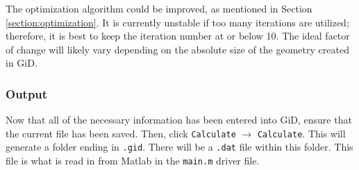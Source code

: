 The optimization algorithm could be improved, as mentioned in Section \ref{section:optimization}. It is currently unstable if too many iterations are utilized; therefore, it is best to keep the iteration number at or below 10. The ideal factor of change will likely vary depending on the absolute size of the geometry created in GiD.

\subsubsection{Output}
Now that all of the necessary information has been entered into GiD, ensure that the current file has been saved. Then, click \texttt{Calculate} $\rightarrow$ \texttt{Calculate}. This will generate a folder ending in \texttt{.gid}. There will be a \texttt{.dat} file within this folder. This file is what is read in from Matlab in the \texttt{main.m} driver file.  